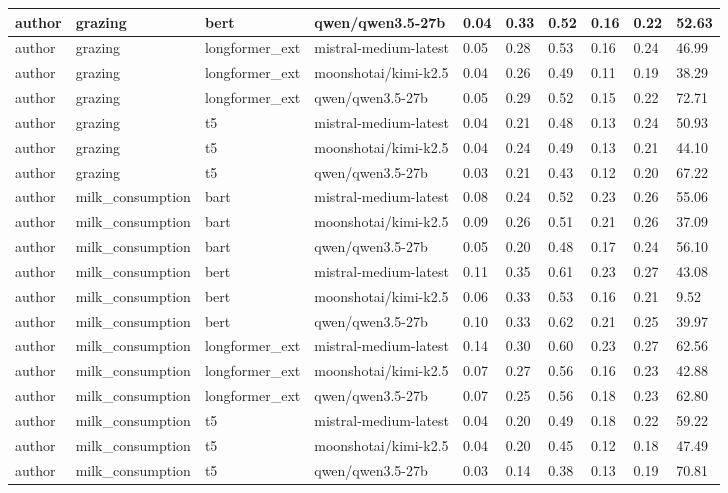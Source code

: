 \begin{tabular}{|l|l|l|l|l|l|l|l|l|l|}
 \hline
 author & grazing & bert & qwen/qwen3.5-27b & 0.04 & 0.33 & 0.52 & 0.16 & 0.22 & 52.63 \\
 \hline
 author & grazing & longformer\_ext & mistral-medium-latest & 0.05 & 0.28 & 0.53 & 0.16 & 0.24 & 46.99 \\
 \hline
 author & grazing & longformer\_ext & moonshotai/kimi-k2.5 & 0.04 & 0.26 & 0.49 & 0.11 & 0.19 & 38.29 \\
 \hline
 author & grazing & longformer\_ext & qwen/qwen3.5-27b & 0.05 & 0.29 & 0.52 & 0.15 & 0.22 & 72.71 \\
 \hline
 author & grazing & t5 & mistral-medium-latest & 0.04 & 0.21 & 0.48 & 0.13 & 0.24 & 50.93 \\
 \hline
 author & grazing & t5 & moonshotai/kimi-k2.5 & 0.04 & 0.24 & 0.49 & 0.13 & 0.21 & 44.10 \\
 \hline
 author & grazing & t5 & qwen/qwen3.5-27b & 0.03 & 0.21 & 0.43 & 0.12 & 0.20 & 67.22 \\
 \hline
 author & milk\_consumption & bart & mistral-medium-latest & 0.08 & 0.24 & 0.52 & 0.23 & 0.26 & 55.06 \\
 \hline
 author & milk\_consumption & bart & moonshotai/kimi-k2.5 & 0.09 & 0.26 & 0.51 & 0.21 & 0.26 & 37.09 \\
 \hline
 author & milk\_consumption & bart & qwen/qwen3.5-27b & 0.05 & 0.20 & 0.48 & 0.17 & 0.24 & 56.10 \\
 \hline
 author & milk\_consumption & bert & mistral-medium-latest & 0.11 & 0.35 & 0.61 & 0.23 & 0.27 & 43.08 \\
 \hline
 author & milk\_consumption & bert & moonshotai/kimi-k2.5 & 0.06 & 0.33 & 0.53 & 0.16 & 0.21 & 9.52 \\
 \hline
 author & milk\_consumption & bert & qwen/qwen3.5-27b & 0.10 & 0.33 & 0.62 & 0.21 & 0.25 & 39.97 \\
 \hline
 author & milk\_consumption & longformer\_ext & mistral-medium-latest & 0.14 & 0.30 & 0.60 & 0.23 & 0.27 & 62.56 \\
 \hline
 author & milk\_consumption & longformer\_ext & moonshotai/kimi-k2.5 & 0.07 & 0.27 & 0.56 & 0.16 & 0.23 & 42.88 \\
 \hline
 author & milk\_consumption & longformer\_ext & qwen/qwen3.5-27b & 0.07 & 0.25 & 0.56 & 0.18 & 0.23 & 62.80 \\
 \hline
 author & milk\_consumption & t5 & mistral-medium-latest & 0.04 & 0.20 & 0.49 & 0.18 & 0.22 & 59.22 \\
 \hline
 author & milk\_consumption & t5 & moonshotai/kimi-k2.5 & 0.04 & 0.20 & 0.45 & 0.12 & 0.18 & 47.49 \\
 \hline
 author & milk\_consumption & t5 & qwen/qwen3.5-27b & 0.03 & 0.14 & 0.38 & 0.13 & 0.19 & 70.81 \\
\hline
\end{tabular}
